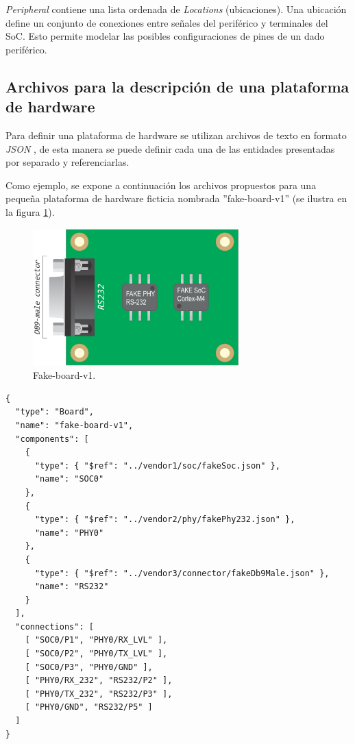 \emph{Peripheral} contiene una lista ordenada de \emph{Locations} (ubicaciones). Una ubicación define un conjunto de conexiones entre señales del periférico y terminales del SoC. Esto permite modelar las posibles configuraciones de pines de un dado periférico.

\subsection{Archivos para la descripción de una plataforma de hardware}

Para definir una plataforma de hardware se utilizan archivos de texto en formato \emph{JSON} \citep{JSON}, de esta manera se puede definir cada una de las entidades presentadas por separado y referenciarlas. 

Como ejemplo, se expone a continuación los archivos propuestos para una pequeña plataforma de hardware ficticia nombrada ''fake-board-v1'' (se ilustra en la figura \ref{fig:fakeBoard}). 

\begin{figure}[!htbp]
\begin{center}  %
\includegraphics*[width=8cm]{Figures/FakeBoard-01.pdf}
\par\caption{Fake-board-v1.}\label{fig:fakeBoard}
\end{center}
\end{figure}



\begin{lstlisting}[caption=Archivo de descripción de \emph{board} nombrado \emph{fakeBoard.json}]
{
  "type": "Board",
  "name": "fake-board-v1",
  "components": [
    {
      "type": { "$ref": "../vendor1/soc/fakeSoc.json" },
      "name": "SOC0"
    },
    {
      "type": { "$ref": "../vendor2/phy/fakePhy232.json" },
      "name": "PHY0"
    },
    {
      "type": { "$ref": "../vendor3/connector/fakeDb9Male.json" },
      "name": "RS232"
    }
  ],
  "connections": [
    [ "SOC0/P1", "PHY0/RX_LVL" ],
    [ "SOC0/P2", "PHY0/TX_LVL" ],
    [ "SOC0/P3", "PHY0/GND" ],
    [ "PHY0/RX_232", "RS232/P2" ],
    [ "PHY0/TX_232", "RS232/P3" ],
    [ "PHY0/GND", "RS232/P5" ]
  ]
}
\end{lstlisting}

